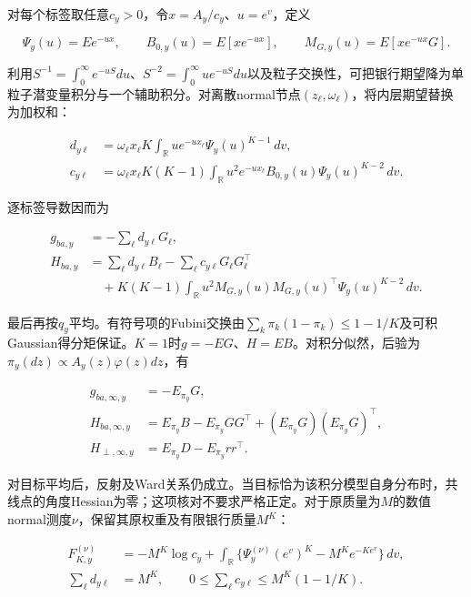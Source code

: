 \documentclass[11pt,a4paper]{article}
\begin{document}
对每个标签取任意\(c_y>0\)，令\(x=A_y/c_y\)、\(u=e^v\)，定义

\[
\Psi_y(u)=E e^{-ux},\qquad B_{0,y}(u)=E[xe^{-ux}],\qquad M_{G,y}(u)=E[xe^{-ux}G].
\tag{I.13}
\]

利用\(S^{-1}=\int_0^\infty e^{-uS}du\)、\(S^{-2}=\int_0^\infty ue^{-uS}du\)以及粒子交换性，可把银行期望降为单粒子潜变量积分与一个辅助积分。对离散normal节点\((z_\ell,\omega_\ell)\)，将内层期望替换为加权和：

\[
\begin{aligned}
d_{y\ell}&=\omega_\ell x_\ell K\int_{\mathbb R}u e^{-ux_\ell}\Psi_y(u)^{K-1}\,dv,\\
c_{y\ell}&=\omega_\ell x_\ell K(K-1)\int_{\mathbb R}u^2e^{-ux_\ell}B_{0,y}(u)\Psi_y(u)^{K-2}\,dv.
\end{aligned}
\tag{I.14}
\]

逐标签导数因而为

\[
\begin{aligned}
g_{ba,y}&=-\sum_\ell d_{y\ell}G_\ell,\\
H_{ba,y}&=\sum_\ell d_{y\ell}B_\ell-\sum_\ell c_{y\ell}G_\ell G_\ell^\top\\
&\quad+K(K-1)\int_{\mathbb R}u^2M_{G,y}(u)M_{G,y}(u)^\top\Psi_y(u)^{K-2}\,dv.
\end{aligned}
\tag{I.15}
\]

最后再按\(q_y\)平均。有符号项的Fubini交换由\(\sum_k\pi_k(1-\pi_k)\le1-1/K\)及可积Gaussian得分矩保证。\(K=1\)时\(g=-EG\)、\(H=EB\)。对积分似然，后验为\(\pi_y(dz)\propto A_y(z)\varphi(z)dz\)，有

\[
\begin{aligned}
g_{ba,\infty,y}&=-E_{\pi_y}G,\\
H_{ba,\infty,y}&=E_{\pi_y}B-E_{\pi_y}GG^\top
+(E_{\pi_y}G)(E_{\pi_y}G)^\top,\\
H_{\perp,\infty,y}&=E_{\pi_y}D-E_{\pi_y}rr^\top.
\end{aligned}
\tag{I.16}
\]

对目标平均后，反射及Ward关系仍成立。当目标恰为该积分模型自身分布时，共线点的角度Hessian为零；这项核对不要求严格正定。对于原质量为\(M\)的数值normal测度\(\nu\)，保留其原权重及有限银行质量\(M^K\)：

\[
\begin{aligned}
F_{K,y}^{(\nu)}&=-M^K\log c_y+
\int_{\mathbb R}\{\Psi_y^{(\nu)}(e^v)^K-M^Ke^{-Ke^v}\}\,dv,\\
\sum_\ell d_{y\ell}&=M^K,\qquad
0\le\sum_\ell c_{y\ell}\le M^K(1-1/K).
\end{aligned}
\tag{I.17}
\]
\end{document}
